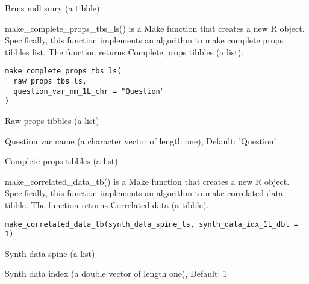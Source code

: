 \documentclass[a4paper]{book}
\begin{document}
%
\begin{Value}
Brms mdl smry (a tibble)
\end{Value}
%
\begin{Description}\relax
make\_complete\_props\_tbs\_ls() is a Make function that creates a new R object. Specifically, this function implements an algorithm to make complete props tibbles list. The function returns Complete props tibbles (a list).
\end{Description}
%
\begin{Usage}
\begin{verbatim}
make_complete_props_tbs_ls(
  raw_props_tbs_ls,
  question_var_nm_1L_chr = "Question"
)
\end{verbatim}
\end{Usage}
%
\begin{Arguments}
\begin{ldescription}
\item[\code{raw\_props\_tbs\_ls}] Raw props tibbles (a list)

\item[\code{question\_var\_nm\_1L\_chr}] Question var name (a character vector of length one), Default: 'Question'
\end{ldescription}
\end{Arguments}
%
\begin{Value}
Complete props tibbles (a list)
\end{Value}
%
\begin{Description}\relax
make\_correlated\_data\_tb() is a Make function that creates a new R object. Specifically, this function implements an algorithm to make correlated data tibble. The function returns Correlated data (a tibble).
\end{Description}
%
\begin{Usage}
\begin{verbatim}
make_correlated_data_tb(synth_data_spine_ls, synth_data_idx_1L_dbl = 1)
\end{verbatim}
\end{Usage}
%
\begin{Arguments}
\begin{ldescription}
\item[\code{synth\_data\_spine\_ls}] Synth data spine (a list)

\item[\code{synth\_data\_idx\_1L\_dbl}] Synth data index (a double vector of length one), Default: 1
\end{ldescription}
\end{Arguments}
\end{document}
